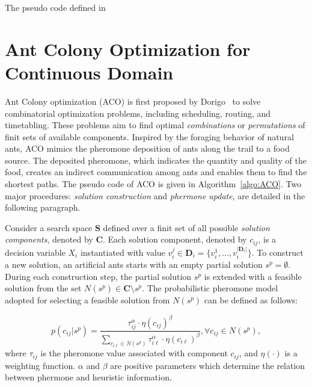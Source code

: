 The pseudo code defined in ~\cite{Zambrano:2013:SPSO2011}


\section{Ant Colony Optimization for Continuous Domain}

Ant Colony optimization (ACO) is first proposed by Dorigo~\cite{Dorigo:1999:ACO} to solve combinatorial optimization problems, including scheduling, routing, and timetabling.
These problems aim to find optimal \textit{combinations} or \textit{permutations} of finit sets of available components.
Inspired by the foraging behavior of natural ants, ACO mimics the pheromone deposition of ants along the trail to a food source.
The deposited pheromone, which indicates the quantity and quality of the food, creates an indirect communication among ants and enables them to find the shortest paths.
The pseudo code of ACO is given in Algorithm~\ref{algo:ACO}.
Two major procedures: \textit{solution construction} and \textit{phermone update}, are detailed in the following paragraph.


Consider a search space $\boldsymbol{S}$ defined over a finit set of all possible \textit{solution components}, denoted by $\boldsymbol{C}$.
Each solution component, denoted by $c_{ij}$, is a decision variable $X_i$ instantiated with value $v^{j}_{i} \in \boldsymbol{D}_i = \{ v^{1}_{i}, ..., v^{|\boldsymbol{D}_i|}_{i}\}$.
To construct a new solution, an artificial ants starts with an empty partial solution $s^{p} = \emptyset$.
During each construction step, the partial solution $s^{p}$ is extended with a feasible solution from the set $N(s^{p}) \in \boldsymbol{C} \setminus s^{p}$.
The probabilistic pheromone model adopted for selecting a feasible solution from $N(s^{p})$ can be defined as follows:

\begin{equation}
p(c_{ij}|s^p) = \frac{\tau^{\alpha}_{ij} \cdot \eta(c_{ij})^{\beta}} 
                     {\sum_{c_{i\ell}\in N(s^{p})} \tau^{\alpha}_{i\ell} \cdot \eta(c_{i\ell})^{\beta} },  \forall c_{ij} \in N(s^{p}),
\end{equation}
where $\tau_{ij}$ is the pheromone value associated with component $c_{ij}$, and $\eta(\cdot)$ is a weighting function. 
$\alpha$ and $\beta$ are positive parameters which determine the relation between phermone and heuristic information.


